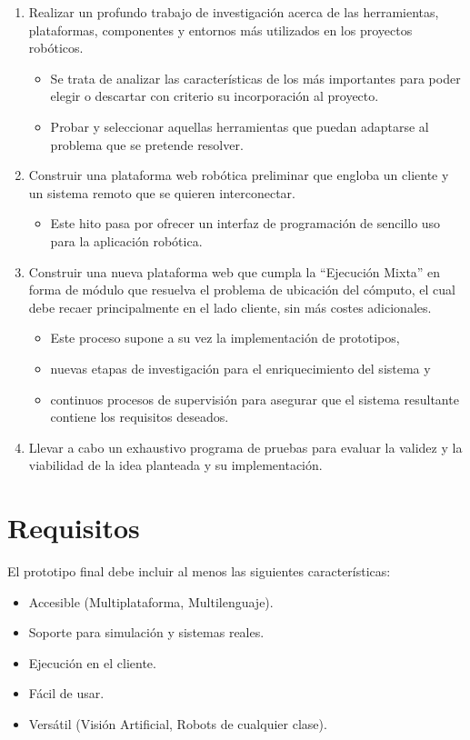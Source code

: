 \begin{enumerate}
\item Realizar un profundo trabajo de investigación acerca de las herramientas, plataformas, componentes y entornos más utilizados en los proyectos robóticos.
    \begin{itemize}
        \item Se trata de analizar las características de los más importantes para poder elegir o descartar con criterio su incorporación al proyecto.
        \item Probar y seleccionar aquellas herramientas que puedan adaptarse al problema que se pretende resolver.
    \end{itemize}
\item Construir una plataforma web robótica preliminar que engloba un cliente y un sistema remoto que se quieren interconectar.
    \begin{itemize}
        \item Este hito pasa por ofrecer un interfaz de programación de sencillo uso para la aplicación robótica.
    \end{itemize}
\item Construir una nueva plataforma web que cumpla la ``Ejecución Mixta'' en forma de módulo que resuelva el problema de ubicación del cómputo, el cual debe recaer principalmente en el lado cliente, sin más costes adicionales.
    \begin{itemize}
        \item Este proceso supone a su vez la implementación de prototipos,
        \item nuevas etapas de investigación para el enriquecimiento del sistema y
        \item continuos procesos de supervisión para asegurar que el sistema resultante contiene los requisitos deseados.
    \end{itemize}
\item  Llevar a cabo un exhaustivo programa de pruebas para evaluar la validez y la viabilidad de la idea planteada y su implementación.
\end{enumerate}

\section{Requisitos}
El prototipo final debe incluir al menos las siguientes características:

\begin{itemize}
    \item Accesible (Multiplataforma, Multilenguaje).
    \item Soporte para simulación y sistemas reales.
    \item Ejecución en el cliente.
    \item Fácil de usar.
    \item Versátil (Visión Artificial, Robots de cualquier clase).
\end{itemize}

